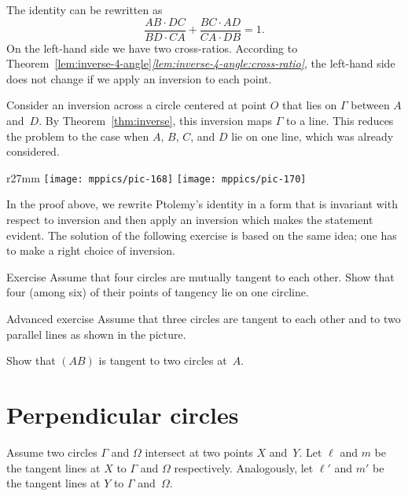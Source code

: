 The identity can be rewritten as 
$$\frac{AB\cdot DC}{ BD\cdot CA}+ \frac{BC\cdot AD}{CA\cdot DB}=1.$$
On the left-hand side we have two cross-ratios.
According to Theorem~\ref{lem:inverse-4-angle}\textit{\ref{lem:inverse-4-angle:cross-ratio}}, the left-hand side does not change if we apply an inversion to each point.

Consider an inversion across a circle centered at point $O$ that lies on $\Gamma$ between $A$ and~$D$.
By 
Theorem~\ref{thm:inverse},
this inversion maps $\Gamma$ to a line.
This reduces the problem to the case when $A$, $B$, $C$, and $D$ lie on one line, which was already considered.
\qeds

{

\begin{wrapfigure}{r}{27mm}
\vskip-4mm
\centering
\texttt{[image: mppics/pic-168]}
\vskip4mm
\texttt{[image: mppics/pic-170]}
\end{wrapfigure}


In the proof above, we rewrite Ptolemy's identity in a form that is invariant with respect to inversion 
and then apply an inversion which makes the statement evident.
The solution of the following exercise is based on the same idea;
one has to make a right choice of inversion.



\begin{thm}{Exercise}\label{ex:4-circles}
Assume that four circles are mutually tangent to each other.
Show that four (among six) of their points of tangency lie on one circline.
\end{thm}


\begin{thm}{Advanced exercise}\label{ex:inverse}
Assume that three circles are tangent to each other and to two parallel lines as shown in the picture.

Show that $(AB)$ is tangent to two circles at~$A$.
\end{thm}

}

\section{Perpendicular circles}

Assume two circles $\Gamma$ and $\Omega$ intersect at two points $X$ and~$Y$.
Let $\ell$ and $m$ be the tangent lines at $X$ to $\Gamma$ and $\Omega$ respectively.
Analogously, let $\ell'$ and $m'$ be the tangent lines at $Y$ to $\Gamma$ and~$\Omega$.

